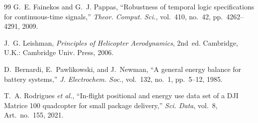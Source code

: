 \documentclass[journal]{IEEEtran}
\begin{document}
\begin{thebibliography}{99}
G.~E. Fainekos and G.~J. Pappas, ``Robustness of temporal logic specifications for continuous-time signals,'' \textit{Theor. Comput. Sci.}, vol.~410, no.~42, pp.~4262--4291, 2009.

J.~G. Leishman, \textit{Principles of Helicopter Aerodynamics}, 2nd~ed. Cambridge, U.K.: Cambridge Univ. Press, 2006.

D.~Bernardi, E.~Pawlikowski, and J.~Newman, ``A general energy balance for battery systems,'' \textit{J. Electrochem. Soc.}, vol.~132, no.~1, pp.~5--12, 1985.

T.~A. Rodrigues \textit{et al.}, ``In-flight positional and energy use data set of a DJI Matrice 100 quadcopter for small package delivery,'' \textit{Sci. Data}, vol.~8, Art.~no.~155, 2021.

\end{thebibliography}
\end{document}
